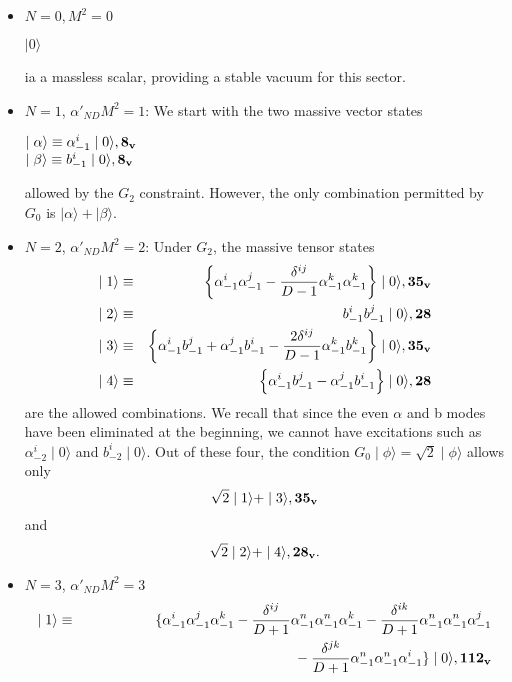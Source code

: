 \documentclass[a4paper,a4paper]{article}
\begin{document}
\begin{itemize}
\item $N=0, M^{2}=0$
\begin{center}
$\mid0\rangle$
\end{center}
ia a massless scalar, providing  a stable vacuum for this sector.
\item $N=1$, $\alpha'_{ND}M^{2}=1$: We start with the two massive
vector states
\begin{center}
$\mid\alpha\rangle \equiv  \alpha_{-1}^{i}\mid0\rangle, {\bf 8_{v}}$\\
\vspace{0.2cm}
 $\mid\beta\rangle \equiv  b_{-1}^{i}\mid0\rangle,{\bf 8_{v}} $
\end{center}
allowed by the $G_2$ constraint.  However, the only combination
permitted by $G_0$ is $\mid\alpha\rangle + \mid\beta\rangle $.
\item $N=2$, $\alpha'_{ND}M^{2}=2$: Under $G_2$, the massive
tensor states
\begin{eqnarray*}
\mid1\rangle &\equiv&
\left\{\alpha_{-1}^{i}\alpha_{-1}^{j}-\frac{\delta^{ij}}{D-1}\alpha_{-1}^{k}\alpha_{-1}^{k}\right\}\mid0\rangle, {\bf 35_{v}}\\
 \mid2\rangle &\equiv&
b_{-1}^{i}b_{-1}^{j}\mid0\rangle, {\bf
28}\\
\mid3\rangle &\equiv&
\left\{\alpha_{-1}^{i}b_{-1}^{j}+\alpha_{-1}^{j}b_{-1}^{i}-\frac{2\delta^{ij}}{D-1}\alpha_{-1}^{k}b_{-1}^{k}\right\}\mid0\rangle, {\bf 35_{v}}\\
\mid4\rangle &\equiv&
\left\{\alpha_{-1}^{i}b_{-1}^{j}-\alpha_{-1}^{j}b_{-1}^{i}\right\}
\mid0\rangle,{\bf28}
\end{eqnarray*}
are the allowed combinations.  We recall that since the even
$\alpha$ and b modes have been eliminated at the beginning, we
cannot have excitations such as $\alpha_{-2}^{i}\mid0\rangle$ and
$b_{-2}^{i}\mid0\rangle$. Out of these four, the condition
$G_0\mid\phi\rangle =\sqrt{2}\mid\phi\rangle$ allows only
\[
\sqrt 2\mid1\rangle + \mid3\rangle,  {\bf35_{v}}
\]
and
\[
\sqrt 2\mid2\rangle + \mid4\rangle, {\bf28_{v}}.
\]
\item $N=3$, $\alpha'_{ND}M^{2}=3$
\begin{eqnarray*}
\mid1\rangle &\equiv&
\{\alpha_{-1}^{i}\alpha_{-1}^{j}\alpha_{-1}^{k}-\frac{\delta^{ij}}{D+1}\alpha_{-1}^{n}\alpha_{-1}^{n}\alpha_{-1}^{k}-\frac{\delta^{ik}}{D+1}\alpha_{-1}^{n}\alpha_{-1}^{n}\alpha_{-1}^{j}\\
&\phantom{-}&\phantom{\{\alpha_{-1}^{i}\alpha_{-1}^{j}\alpha_{-1}^{k}-\frac{\delta^{ij}}{D+1}\alpha_{-1}^{n}\alpha_{-1}^{n}\alpha_{-1}^{k}}-\frac{\delta^{jk}}{D+1}\alpha_{-1}^{n}\alpha_{-1}^{n}\alpha_{-1}^{i}\}\mid0\rangle,{\bf112_{v}}\\

\end{eqnarray*}
\end{itemize}
\end{document}
